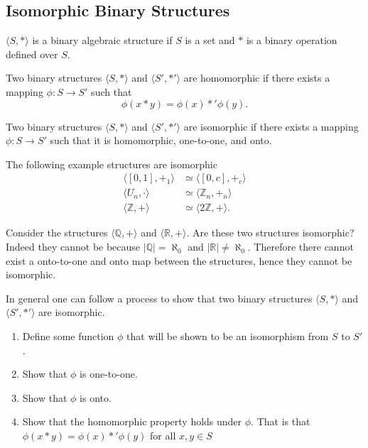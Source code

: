 \documentclass[../notes.tex]{subfiles}
\begin{document}

\subsection{Isomorphic Binary Structures}

\begin{definition}
	$\langle S, * \rangle$ is a binary algebraic structure if $S$ is a set and $*$ is a binary operation defined over $S$.
\end{definition}

\begin{definition}
	Two binary structures $\langle S, * \rangle$ and $\langle S', *' \rangle$ are homomorphic if there exists a mapping $\phi: S \to S'$ such that
	\[
		\phi(x * y) = \phi(x) *' \phi(y)
	.\]
\end{definition}

\begin{definition}
	Two binary structures $\langle S, * \rangle$ and $\langle S', *' \rangle$ are isomorphic if there exists a mapping $\phi: S \to S'$ such that it is homomorphic, one-to-one, and onto.
\end{definition}

The following example structures are isomorphic
\begin{align*}
	\langle [0,1], +_1 \rangle &\simeq \langle [0,c], +_c \rangle \\
	\langle U_n, \boldsymbol{\cdot} \rangle &\simeq \langle \mathbb{Z}_n, +_n \rangle \\
	\langle \mathbb{Z}, + \rangle &\simeq \langle 2\mathbb{Z}, + \rangle
.\end{align*}

Consider the structures $\langle \mathbb{Q}, + \rangle$ and $\langle \mathbb{R}, + \rangle$. Are these two structures isomorphic? Indeed they cannot be because $| \mathbb{Q} | = \aleph_0$ and $| \mathbb{R} | \neq \aleph_0 $. Therefore there cannot exist a onto-to-one and onto map between the structures, hence they cannot be isomorphic. 
\begin{tcolorbox}[sharp corners = all, colback = white]
	In general one can follow a process to show that two binary structures $\langle S, * \rangle$ and $\langle S', *' \rangle$ are isomorphic.

\begin{enumerate}[leftmargin=0.5cm]
		\item Define some function $\phi$ that will be shown to be an isomorphism from $S$ to $S'$.
		\item Show that $\phi$ is one-to-one.
		\item Show that $\phi$ is onto.
		\item Show that the homomorphic property holds under $\phi$. That is that $\phi(x * y) = \phi(x) *' \phi(y)$ for all $x,y \in S$
	\end{enumerate}
\end{tcolorbox}
\end{document}

